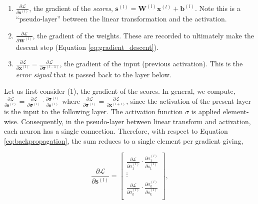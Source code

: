 \begin{enumerate}
\item $\frac{\partial\mathcal{L}}{\partial \mathbf{s}^{(l)}}$, the gradient of the \emph{scores}, $\mathbf{s}^{(l)} = \mathbf{W}^{(l)}\mathbf{x}^{(l)} + \mathbf{b}^{(l)}$. Note this is a ``pseudo-layer'' between the linear transformation and the activation.
\item $\frac{\partial\mathcal{L}}{\partial \mathbf{W}^{(l)}}$, the gradient of the weights. These are recorded to ultimately make the descent step (Equation \ref{eq:gradient_descent}).
\item $\frac{\partial\mathcal{L}}{\partial \mathbf{x}^{(l)}} = \frac{\partial\mathcal{L}}{\partial \mathbf{\sigma}^{(l-1)}}$, the gradient of the input (previous activation). This is the \emph{error signal} that is passed back to the layer below.
\end{enumerate}

Let us first consider (1), the gradient of the scores. In general, we compute, $\frac{\partial\mathcal{L}}{\partial \mathbf{s}^{(l)}} = \frac{\partial\mathcal{L}}{\partial \boldsymbol\sigma^{(l)}}\cdot\frac{\partial\boldsymbol\sigma^{(l)}}{\partial\mathbf{s}^{(l)}}$ where $\frac{\partial\mathcal{L}}{\partial \boldsymbol\sigma^{(l)}} = \frac{\partial\mathcal{L}}{\partial \mathbf{x}^{(l+1)}}$, since the activation of the present layer is the input to the following layer. The activation function $\sigma$ is applied element-wise. Consequently, in the pseudo-layer between linear transform and activation, each neuron has a single connection. Therefore, with respect to Equation \ref{eq:backpropagation}, the sum reduces to a single element per gradient giving,


\begin{equation}
\frac{\partial\mathcal{L}}{\partial \mathbf{s}^{(l)}} =
\begin{bmatrix}
\frac{\partial\mathcal{L}}{\partial\sigma_1^{(l)}}\cdot\frac{\partial\sigma_1^{(l)}}{\partial{s}_1^{(l)}} \\ 
\vdots \\
\frac{\partial\mathcal{L}}{\partial\sigma_k^{(l)}}\cdot\frac{\partial\sigma_k^{(l)}}{\partial{s}_k^{(l)}} \\
\end{bmatrix},
\label{eq:backprop_scores}
\end{equation}


